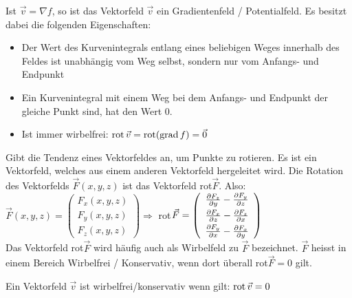 \begin{definition}
Ist $\vec{v} = \nabla f$, so ist das Vektorfeld $\vec{v}$
ein Gradientenfeld / Potentialfeld. Es besitzt dabei die folgenden
Eigenschaften:
\begin{itemize}
	\item Der Wert des Kurvenintegrals entlang eines beliebigen Weges innerhalb des
	Feldes ist unabhängig vom Weg selbst, sondern nur vom Anfangs- und Endpunkt
	\item Ein Kurvenintegral mit einem Weg bei dem Anfangs- und Endpunkt der
	gleiche Punkt sind, hat den Wert 0.
	\item Ist immer wirbelfrei: $\operatorname{rot} \vec{v} = \operatorname{rot}(\operatorname{grad} f) = \vec{0}$
\end{itemize}
\end{definition}

\begin{definition}
Gibt die Tendenz eines Vektorfeldes an, um Punkte zu rotieren. Es ist ein Vektorfeld, welches aus einem anderen Vektorfeld hergeleitet wird. Die Rotation des Vektorfelds $\vec{F} (x, y, z)$ ist das Vektorfeld rot$\vec{F}$. Also: 
$\vec{F} (x, y, z) = 
\left(
	\begin{array}{c}
		F_x (x, y, z) \\
		F_y (x, y, z) \\
		F_z (x, y, z)
	\end{array}
\right) \Rightarrow$
 rot$\vec{F} = 
\left(
	\begin{array}{c}
		\vspace{3pt} \frac{\partial F_z}{\partial y} - \frac{\partial F_y}{\partial z} \\
		\vspace{3pt} \frac{\partial F_x}{\partial z} - \frac{\partial F_z}{\partial x} \\
		\frac{\partial F_y}{\partial x} - \frac{\partial F_x}{\partial y}
	\end{array}
\right)$\\
Das Vektorfeld rot$\vec{F}$ wird häufig auch als Wirbelfeld zu $\vec{F}$ bezeichnet. $\vec{F}$ heisst in einem Bereich Wirbelfrei / Konservativ, wenn dort überall rot$\vec{F} = 0$ gilt.
\end{definition}

\begin{definition}
Ein Vektorfeld $\vec{v}$ ist wirbelfrei/konservativ wenn gilt: $\operatorname{rot} \vec{v} = 0$
\end{definition}

